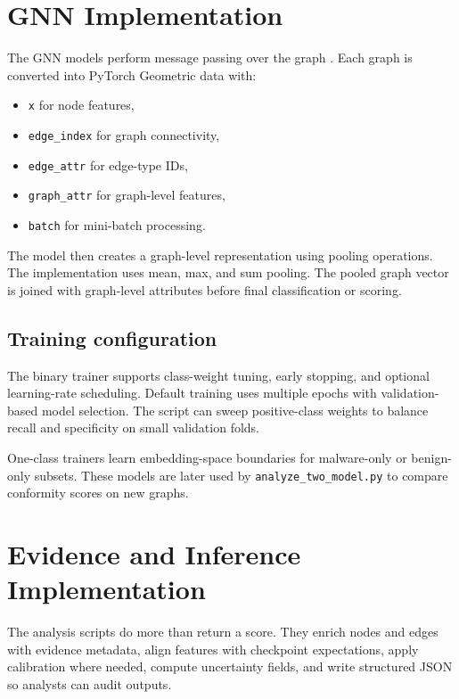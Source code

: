 \section{GNN Implementation}

The GNN models perform message passing over the graph \cite{hamilton2020graph}. Each graph is converted into PyTorch Geometric data \cite{fey2019pyg} with:

\begin{itemize}
\item \texttt{x} for node features,
\item \texttt{edge\_index} for graph connectivity,
\item \texttt{edge\_attr} for edge-type IDs,
\item \texttt{graph\_attr} for graph-level features,
\item \texttt{batch} for mini-batch processing.
\end{itemize}

The model then creates a graph-level representation using pooling operations. The implementation uses mean, max, and sum pooling. The pooled graph vector is joined with graph-level attributes before final classification or scoring.

\subsection{Training configuration}

The binary trainer supports class-weight tuning, early stopping, and optional learning-rate scheduling. Default training uses multiple epochs with validation-based model selection. The script can sweep positive-class weights to balance recall and specificity on small validation folds.

One-class trainers learn embedding-space boundaries for malware-only or benign-only subsets. These models are later used by \texttt{analyze\_two\_model.py} to compare conformity scores on new graphs.

\section{Evidence and Inference Implementation}

The analysis scripts do more than return a score. They enrich nodes and edges with evidence metadata, align features with checkpoint expectations, apply calibration where needed, compute uncertainty fields, and write structured JSON so analysts can audit outputs.

